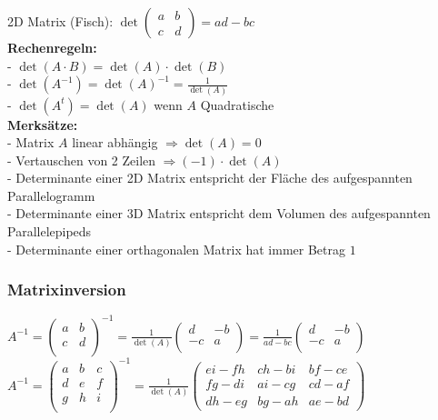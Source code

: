 2D Matrix (Fisch): \hspace{1cm} $\det \begin{pmatrix}a & b \\ c
& d \end{pmatrix} = a d - b c$\\

\textbf{Rechenregeln:}\\
- $\det(A \cdot B) = \det(A) \cdot \det(B)$\\
- $\det(A^{-1})=\det(A)^{-1}=\frac{1}{\det(A)}$\\
- $\det(A^t)=\det(A)$ wenn $A$ Quadratische \\

\textbf{Merksätze:}\\
- Matrix $A$ linear abhängig $\Rightarrow \det(A)=0$\\
- Vertauschen von 2 Zeilen $\Rightarrow (-1)\cdot \det(A)$\\
- Determinante einer 2D Matrix entspricht der Fläche des aufgespannten
Parallelogramm\\
- Determinante einer 3D Matrix entspricht dem Volumen des aufgespannten
Parallelepipeds\\
- Determinante einer orthagonalen Matrix hat immer Betrag $1$

\subsubsection{Matrixinversion}
	$A^{-1} = \begin{pmatrix}
	a & b \\ c & d \\
	\end{pmatrix}^{-1} =
	\frac{1}{\det(A)} \begin{pmatrix}
	d & -b \\ -c & a \\
	\end{pmatrix}  =
	\frac{1}{ad-bc} \begin{pmatrix}
	d & -b \\ -c & a \\
	\end{pmatrix}\quad$\\
	$A^{-1} = \begin{pmatrix}
	a & b & c\\ d & e & f \\ g & h & i \\
	\end{pmatrix}^{-1} =
	\frac{1}{\det(A)} \begin{pmatrix}
	ei - fh & ch - bi & bf - ce \\
	fg - di & ai - cg & cd - af \\
	dh - eg & bg - ah & ae - bd
	\end{pmatrix}$\\

